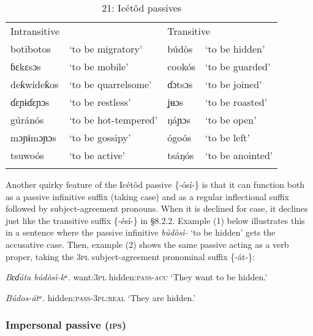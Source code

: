 \begin{table}
\caption{21: Icétôd passives}
\label{tab:8}


\begin{tabularx}{\textwidth}{XXXX}
\lsptoprule

Intransitive &  & \multicolumn{2}{X}{Transitive}\\
botibotos & ‘to be migratory’ & búdòs & ‘to be hidden’\\
ɓɛkɛsɔs & ‘to be mobile’ & cookós & ‘to be guarded’\\
deƙwideƙos & ‘to be quarrelsome’ & ɗɔtsɔs & ‘to be joined’\\
ɗɛɲɨɗɛɲɔs & ‘to be restless’ & ʝʉɔs & ‘to be roasted’\\
gúránós & ‘to be hot-tempered’ & ŋáɲɔs & ‘to be open’\\
mɔɲɨmɔɲɔs & ‘to be gossipy’ & ógoós & ‘to be left’\\
tsuwoós & ‘to be active’ & tsáŋós & ‘to be anointed’\\
\lspbottomrule
\end{tabularx}
\end{table}
Another quirky feature of the Icétôd passive \{-ósí-\} is that it can function both as a passive infinitive suffix (taking case) and as a regular inflectional suffix followed by subject-agreement pronouns. When it is declined for case, it declines just like the transitive suffix \{-ésí-\} in §8.2.2. Example (1) below illustrates this in a sentence where the passive infinitive \textit{búdòsì-} ‘to be hidden’ gets the accusative case. Then, example (2) shows the same passive acting as a verb proper, taking the 3\textsc{pl} subject-agreement pronominal suffix \{-át-\}:




\textit{Bɛɗáta   búd}\textit{òsì}\textit{{}-kᵃ.}
want:\textsc{3pl}   hidden:\textsc{pass-acc}
‘They want to be hidden.’




\textit{Búd}\textit{os}\textit{{}-átᵃ.}
hidden:\textsc{pass}{}-\textsc{3pl:real}
‘They are hidden.’




\subsubsection{Impersonal passive (\textsc{ips})}

